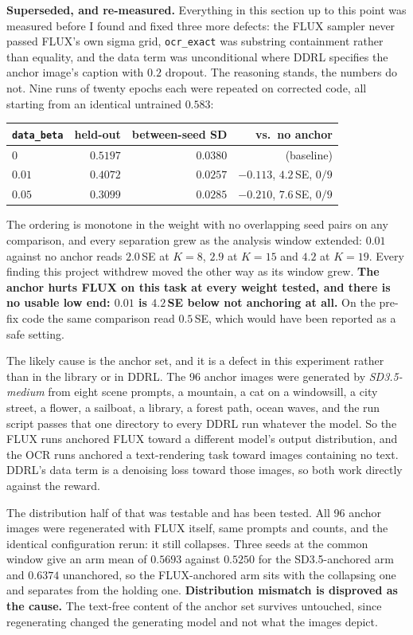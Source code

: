 \documentclass[11pt]{article}
\newcommand{\code}[1]{\texttt{\small #1}}
\begin{document}
\textbf{Superseded, and re-measured.} Everything in this section up to this point was measured before I found and fixed three more defects: the FLUX sampler never passed FLUX's own sigma grid, \code{ocr\_exact} was substring containment rather than equality, and the data term was unconditional where DDRL specifies the anchor image's caption with $0.2$ dropout. The reasoning stands, the numbers do not. Nine runs of twenty epochs each were repeated on corrected code, all starting from an identical untrained $0.583$:

\begin{center}
\begin{tabular}{lrrr}
\toprule
\code{data\_beta} & held-out & between-seed SD & vs.\ no anchor \\
\midrule
$0$ & $0.5197$ & $0.0380$ & (baseline) \\
$0.01$ & $0.4072$ & $0.0257$ & $-0.113$, $4.2$\,SE, $0/9$ \\
$0.05$ & $0.3099$ & $0.0285$ & $-0.210$, $7.6$\,SE, $0/9$ \\
\bottomrule
\end{tabular}
\end{center}

\noindent The ordering is monotone in the weight with no overlapping seed pairs on any comparison, and every separation grew as the analysis window extended: $0.01$ against no anchor reads $2.0$\,SE at $K{=}8$, $2.9$ at $K{=}15$ and $4.2$ at $K{=}19$. Every finding this project withdrew moved the other way as its window grew. \textbf{The anchor hurts FLUX on this task at every weight tested, and there is no usable low end: $0.01$ is $4.2$\,SE below not anchoring at all.} On the pre-fix code the same comparison read $0.5$\,SE, which would have been reported as a safe setting.

The likely cause is the anchor set, and it is a defect in this experiment rather than in the library or in DDRL. The 96 anchor images were generated by \emph{SD3.5-medium} from eight scene prompts, a mountain, a cat on a windowsill, a city street, a flower, a sailboat, a library, a forest path, ocean waves, and the run script passes that one directory to every DDRL run whatever the model. So the FLUX runs anchored FLUX toward a different model's output distribution, and the OCR runs anchored a text-rendering task toward images containing no text. DDRL's data term is a denoising loss toward those images, so both work directly against the reward.

The distribution half of that was testable and has been tested. All 96 anchor images were regenerated with FLUX itself, same prompts and counts, and the identical configuration rerun: it still collapses. Three seeds at the common window give an arm mean of $0.5693$ against $0.5250$ for the SD3.5-anchored arm and $0.6374$ unanchored, so the FLUX-anchored arm sits with the collapsing one and separates from the holding one. \textbf{Distribution mismatch is disproved as the cause.} The text-free content of the anchor set survives untouched, since regenerating changed the generating model and not what the images depict.
\end{document}

